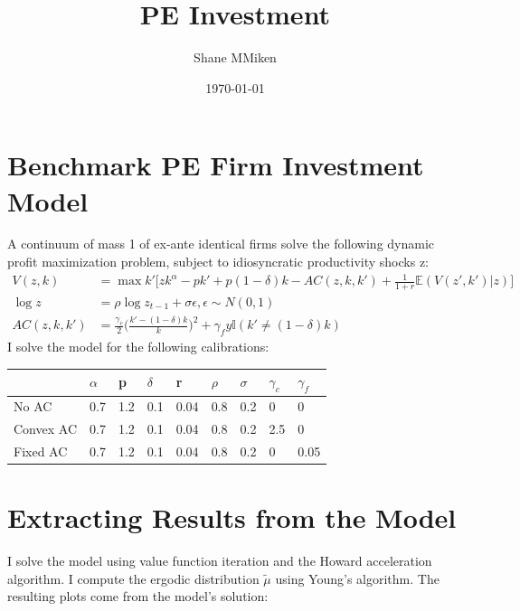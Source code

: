 \documentclass[12pt,english]{article}
\theoremstyle{remark}
\newcommand{\Mc}{M{\large\raisebox{0.35ex}{{{\smash{c}}}}}}
\newcommand{\E}{\mathbb{E}}
\begin{document}
	\title{PE Investment
	}
	\date{\today} %
	\author{Shane \Mc Miken}
	
	\maketitle
	\section*{Benchmark PE Firm Investment Model}
	A continuum of mass 1 of ex-ante identical firms solve the following dynamic profit maximization problem, subject to idiosyncratic productivity shocks z:
	\begin{align*}
		V(z,k) &= \max{k'} \bigg[zk^\alpha - p k' + p(1-\delta)k -AC(z,k,k') + \frac{1}{1+r} \E(V(z',k')|z)\bigg]
		\\
		\log z &= \rho \log z_{t-1} + \sigma \epsilon, \epsilon \sim N(0,1)
		\\
		AC(z,k,k') &= \frac{\gamma_c}{2} \bigg(\frac{k' -(1-\delta)k}{k}\bigg)^2 + \gamma_f y \mathbb{I}(k' \neq (1-\delta)k)
	\end{align*}
	I solve the model for the following calibrations:
	\begin{table}[h]
		\begin{center}
			\begin{tabular}{ p{3cm}|p{1cm}|p{1cm}|p{1cm}|p{1cm}|p{1cm}|p{1cm}|p{1cm}|p{1cm}  }
				& $\alpha$  & p & $\delta$ & r & $\rho$ & $\sigma$ & $\gamma_c$ & $\gamma_f$ \\
				\hline
				No AC & 0.7  & 1.2 & 0.1 & 0.04 & 0.8 & 0.2 & 0 & 0 \\
				\hline
				Convex AC & 0.7  & 1.2 & 0.1 & 0.04 & 0.8 & 0.2 & 2.5 & 0 \\
				Fixed AC & 0.7  & 1.2 & 0.1 & 0.04 & 0.8 & 0.2 & 0 & 0.05 \\
			\end{tabular}
		\end{center}
	\end{table}
	\section*{Extracting Results from the Model}
	I solve the model using value function iteration and the Howard acceleration algorithm. I compute the ergodic distribution $\tilde \mu$ using Young's algorithm. The resulting plots come from the model's solution:
	
\end{document}
